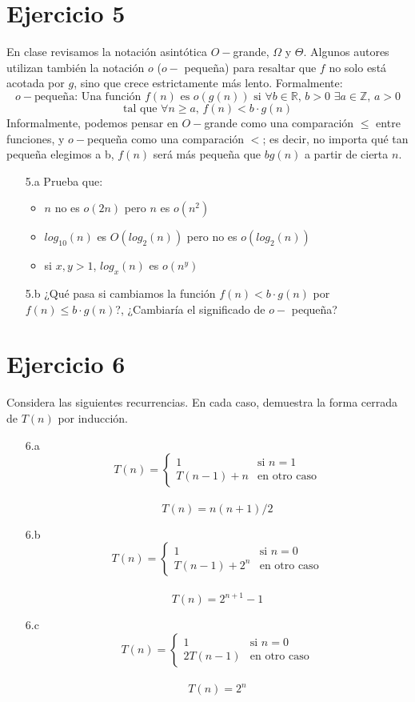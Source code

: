 \documentclass[12pt]{article}
\begin{document}
\section*{Ejercicio 5}
En clase revisamos la notación asintótica $O-$grande, $\Omega$ y $\Theta$. Algunos autores utilizan también la notación $o$ ($o-$ pequeña) para resaltar que $f$ no solo está acotada por $g$, sino que crece estrictamente más lento. Formalmente:
\[
    o-\text{pequeña: Una función } f(n) \text{ es } o(g(n)) \text{ si } \forall b \in \mathbb{R}, \, b>0 \,\, \exists a \in \mathbb{Z},\, a>0
\]
\[
    \text{tal que } \forall n \geq a, \, f(n) < b \cdot g(n)
\]
Informalmente, podemos pensar en $O-$grande como una comparación $\leq$ entre funciones, y $o-$pequeña como una comparación $<$; es decir, no importa qué tan pequeña elegimos a b, $f(n)$ será más pequeña que $bg(n)$ a partir de cierta $n$.
\begin{itemize}
    \item[5.a] Prueba que:
        \begin{itemize}
            \item $n$ no es $o(2n)$ pero $n$ es $o(n^2)$
            \item $log_{10}(n)$ es $O(log_2(n))$ pero no es $o(log_2(n))$
            \item si $x, y > 1$, $log_x(n)$ es $o(n^y)$
        \end{itemize}
    \item[5.b] ¿Qué pasa si cambiamos la función $f(n) < b \cdot g(n)$ por $f(n) \leq b \cdot g(n)$?, ¿Cambiaría el significado de $o-$ pequeña?
\end{itemize}

\section*{Ejercicio 6}
Considera las siguientes recurrencias. En cada caso, demuestra la forma cerrada de $T(n)$ por inducción.
\begin{itemize}
    \item[6.a]  
    \[
        T(n) = \left\{ \begin{array}{ll}
        1 & \text{si } n=1\\ T(n-1)+n & \text{en otro caso} \end{array}\right.
    \]
    \\
    \[
        T(n) = n(n+1)/2
    \]
    \item[6.b]
    \[
        T(n) = \left\{ \begin{array}{ll}
        1 & \text{si } n=0\\ T(n-1)+2^n & \text{en otro caso} \end{array}\right.
    \]
    \\
    \[
        T(n) = 2^{n+1}-1
    \]
    \item[6.c]
    \[
        T(n) = \left\{ \begin{array}{ll}
        1 & \text{si } n=0\\ 2T(n-1) & \text{en otro caso} \end{array}\right.
    \]
    \\
    \[
        T(n) = 2^n
    \]
\end{itemize}
\end{document}
